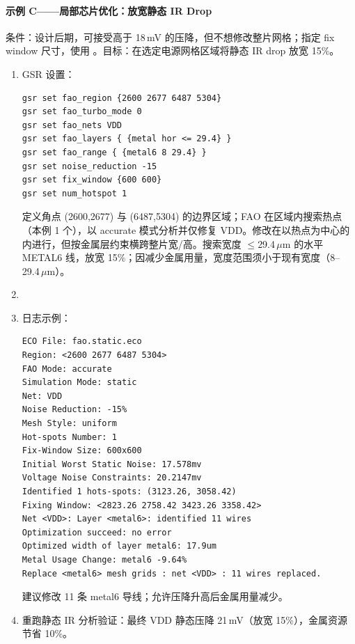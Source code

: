 \paragraph{示例 C——局部芯片优化：放宽静态 IR Drop}
条件：设计后期，可接受高于 18\,mV 的压降，但不想修改整片网格；指定 fix window 尺寸，使用 。目标：在选定电源网格区域将静态 IR drop 放宽 15\%。
\begin{enumerate}
  \item GSR 设置：
\begin{lstlisting}
gsr set fao_region {2600 2677 6487 5304}
gsr set fao_turbo_mode 0
gsr set fao_nets VDD
gsr set fao_layers { {metal hor <= 29.4} }
gsr set fao_range { {metal6 8 29.4} }
gsr set noise_reduction -15
gsr set fix_window {600 600}
gsr set num_hotspot 1
\end{lstlisting}
  定义角点 (2600,2677) 与 (6487,5304) 的边界区域；FAO 在区域内搜索热点（本例 1 个），以 accurate 模式分析并仅修复 VDD。修改在以热点为中心的  内进行，但按金属层约束横跨整片宽/高。搜索宽度 $\leq$29.4\,$\mu$m 的水平 METAL6 线，放宽 15\%；因减少金属用量，宽度范围须小于现有宽度（8--29.4\,$\mu$m）。
  \item {}
  \item 日志示例：
\begin{lstlisting}
ECO File: fao.static.eco
Region: <2600 2677 6487 5304>
FAO Mode: accurate
Simulation Mode: static
Net: VDD
Noise Reduction: -15%
Mesh Style: uniform
Hot-spots Number: 1
Fix-Window Size: 600x600
Initial Worst Static Noise: 17.578mv
Voltage Noise Constraints: 20.2147mv
Identified 1 hots-spots: (3123.26, 3058.42)
Fixing Window: <2823.26 2758.42 3423.26 3358.42>
Net <VDD>: Layer <metal6>: identified 11 wires
Optimization succeed: no error
Optimized width of layer metal6: 17.9um
Metal Usage Change: metal6 -9.64%
Replace <metal6> mesh grids : net <VDD> : 11 wires replaced.
\end{lstlisting}
  建议修改 11 条 metal6 导线；允许压降升高后金属用量减少。
  \item 重跑静态 IR 分析验证：最终 VDD 静态压降 21\,mV（放宽 15\%），金属资源节省 10\%。
\end{enumerate}

